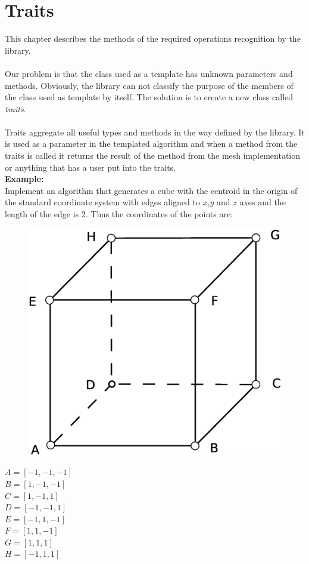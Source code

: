 \chapter{Traits}
\label{chap:traits}

This chapter describes the methods of the required operations recognition by the library.\\
\\
Our problem is that the class used as a template has unknown parameters and
methods. Obviously, the library can not classify the purpose of the members of
the class used as template by itself. The solution is to create a new class called \emph{traits}.\\
\\
Traits aggregate all useful types and methods in the way defined by the library.
It is used as a parameter in the templated algorithm and when a method from the traits is called it
returns the result of the method from the mesh implementation or anything that has
a user put into the traits.\\

\textbf{Example:}\\
Implement an algorithm that generates a cube with the centroid in the origin of
the standard coordinate system with edges aligned to $x$,$y$ and $z$ axes and the
length of the edge is $2$. Thus the coordinates of the points are:
\vspace{5mm}
\begin{multicols}{2}
\begin{figure}[H]
\centering
\includegraphics[width=0.6\linewidth]{../img/cube_example.eps}
\end{figure}
\columnbreak
\setlength{\parindent}{0cm}
$A = [-1,-1,-1]$\\
$B = [1,-1,-1]$\\
$C = [1,-1,1]$\\
$D = [-1,-1,1]$\\
$E = [-1,1,-1]$\\
$F = [1,1,-1]$\\
$G = [1,1,1]$\\
$H = [-1,1,1]$\\

\setlength{\parindent}{0.5cm}
\label{mcols:traits_example}

\end{multicols}

